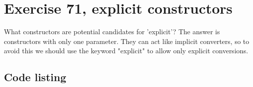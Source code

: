 \documentclass[11pt]{article}
\begin{document}
\section*{Exercise 71, explicit constructors}
What constructors are potential candidates for 'explicit'?
The answer is constructors with only one parameter.
They can act like implicit converters, so to avoid this we should use the keyword "explicit" to allow only explicit conversions.

\subsection*{Code listing}

\end{document}
